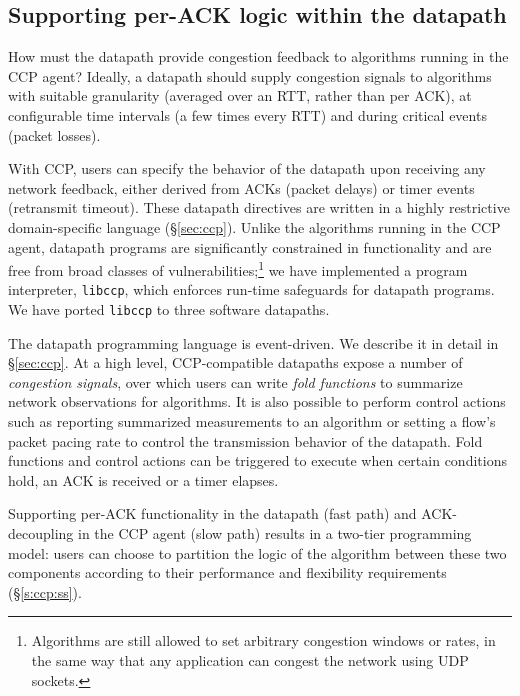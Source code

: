 \subsection{Supporting per-ACK logic within the datapath}
\label{sec:design:exercising-control-over-datapath}
\label{sec:design:restricted-datapath-functions}

How must the datapath provide congestion feedback to algorithms running in the CCP agent?
%
Ideally, a datapath should supply congestion signals to algorithms with suitable granularity (\eg averaged over an RTT, rather than per ACK), at configurable time intervals (\eg a few times every RTT) and during critical events (\eg packet losses).

With CCP, users can specify the behavior of the datapath upon receiving any network feedback, either derived from ACKs (\eg packet delays) or timer events (\eg retransmit timeout).
%
These datapath directives are written in a highly restrictive domain-specific language (\S\ref{sec:ccp}).
%
Unlike the algorithms running in the CCP agent, datapath programs are significantly constrained in functionality and are free from broad classes of vulnerabilities;\footnote{Algorithms are still allowed to set arbitrary congestion windows or rates, in the same way that any application can congest the network using UDP sockets.
}
%
we have implemented a program interpreter, {\tt libccp}, which enforces run-time safeguards for datapath programs. We have ported {\tt libccp} to three software datapaths.


The datapath programming language is event-driven. We describe it in detail in \S\ref{sec:ccp}.
%
At a high level, CCP-compatible datapaths expose a number of {\em congestion signals}, over which users can write {\em fold functions} to summarize network observations for algorithms.
%
It is also possible to perform control actions such as reporting summarized measurements to an algorithm or setting a flow's packet pacing rate to control the transmission behavior of the datapath.
%
Fold functions and control actions can be triggered to execute when certain conditions hold, \eg an ACK is received or a timer elapses.


Supporting per-ACK functionality in the datapath (fast path) and ACK-decoupling in the CCP agent (slow path) results in a two-tier programming model:
%
users can choose to partition the logic of the algorithm between these two components according to their performance and flexibility requirements (\S\ref{s:ccp:ss}).

